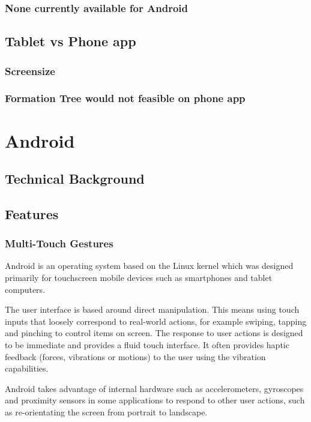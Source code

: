 \documentclass{report}
\begin{document}
\subsection{None currently available for Android}

\section{Tablet vs Phone app}
\subsection{Screensize}
\subsection{Formation Tree would not feasible on phone app}

\chapter{Android}

\section{Technical Background}

\section{Features}

\subsection{Multi-Touch Gestures}


Android is an operating system based on the Linux kernel which was designed primarily for touchscreen mobile devices such as smartphones and tablet computers\cite{androidwiki}.

The user interface is based around direct manipulation. This means using touch inputs that loosely correspond to real-world actions, for example swiping, tapping and pinching to control items on screen. The response to user actions is designed to be immediate and provides a fluid touch interface. It often provides haptic feedback (forces, vibrations or motions) to the user using the vibration capabilities.

Android takes advantage of internal hardware such as accelerometers, gyroscopes and proximity sensors in some applications to respond to other user actions, such as re-orientating the screen from portrait to landscape.
\end{document}
